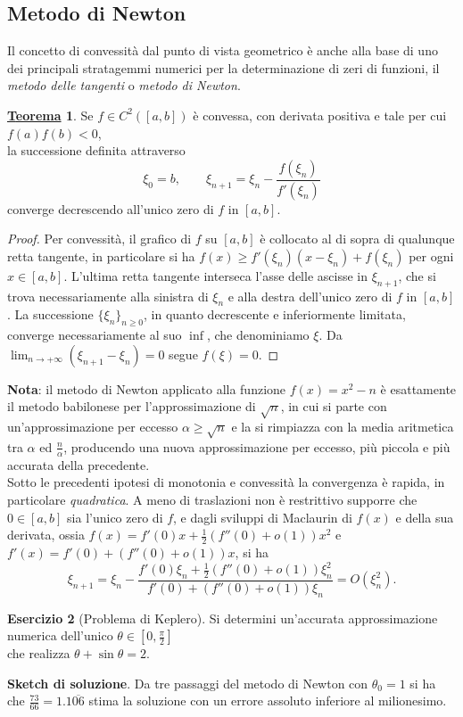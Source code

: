 \documentclass[a4paper,twoside]{article}
\theoremstyle{definition}
\newtheorem{theorem}{\color{Red}\underline{\textrm Teorema}}
\newenvironment{theo}
  {\begin{shaded}\begin{theorem}}
  {\end{theorem}\end{shaded}}
\newtheorem{ex}[theorem]{Esercizio}
\numberwithin{theorem}{section}
\begin{document}
\subsection{Metodo di Newton}
Il concetto di convessità dal punto di vista geometrico è anche alla base di uno dei principali stratagemmi numerici per la determinazione di zeri di funzioni, il \emph{metodo delle tangenti} o \emph{metodo di Newton}.

\begin{theo} Se $f\in C^2([a,b])$ è convessa, con derivata positiva e tale per cui $f(a)f(b)<0$,\\ la successione definita attraverso 
$$ \xi_0 = b,\qquad \xi_{n+1} = \xi_n - \frac{f(\xi_n)}{f'(\xi_n)} $$
converge decrescendo all'unico zero di $f$ in $[a,b]$.  
\end{theo}
\begin{proof}
Per convessità, il grafico di $f$ su $[a,b]$ è collocato al di sopra di qualunque retta tangente, in particolare si ha $f(x)\geq f'(\xi_n)(x-\xi_n)+f(\xi_n)$ per ogni $x\in[a,b]$. L'ultima retta tangente interseca l'asse delle ascisse in $\xi_{n+1}$, che si trova necessariamente alla sinistra di $\xi_n$ e alla destra dell'unico zero di $f$ in $[a,b]$. La successione $\{\xi_n\}_{n\geq 0}$, in quanto decrescente e inferiormente limitata, converge necessariamente al suo $\inf$, che denominiamo $\xi$. Da $\lim_{n\to +\infty}(\xi_{n+1}-\xi_n)=0$ segue $f(\xi)=0$.
\end{proof}

\textbf{Nota}: il metodo di Newton applicato alla funzione $f(x)=x^2-n$ è esattamente il metodo babilonese per l'approssimazione di $\sqrt{n}$, in cui si parte con un'approssimazione per eccesso $\alpha \geq \sqrt{n}$ e la si rimpiazza con la media aritmetica tra $\alpha$ ed $\frac{n}{\alpha}$, producendo una nuova approssimazione per eccesso, più piccola e più accurata della precedente.\\

Sotto le precedenti ipotesi di monotonia e convessità la convergenza è rapida, in particolare \emph{quadratica}. A meno di traslazioni non è restrittivo supporre che $0\in[a,b]$ sia l'unico zero di $f$, e dagli sviluppi di Maclaurin di $f(x)$ e della sua derivata, ossia $f(x)=f'(0)x + \frac{1}{2}(f''(0)+o(1))x^2$ e $f'(x)=f'(0)+(f''(0)+o(1))x$, si ha 
$$ \xi_{n+1} = \xi_n - \frac{f'(0)\xi_n + \frac{1}{2}(f''(0)+o(1))\xi_n^2}{f'(0)+(f''(0)+o(1))\xi_n} = O(\xi_n^2). $$

\begin{ex}[Problema di Keplero] Si determini un'accurata approssimazione numerica dell'unico $\theta\in\left[0,\frac{\pi}{2}\right]$\\ che realizza $\theta+\sin\theta = 2$. 
\end{ex}
\textbf{Sketch di soluzione}. Da tre passaggi del metodo di Newton con $\theta_0=1$ si ha che $\frac{73}{66}=1.1\overline{06}$ stima la soluzione con un errore assoluto inferiore al milionesimo.
\end{document}

